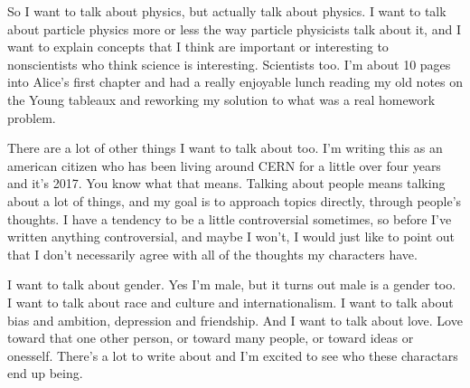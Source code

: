So I want to talk about physics, but actually talk about physics. I want to talk about particle physics more or less the way particle physicists talk about it, and I want to explain concepts that I think are important or interesting to nonscientists who think science is interesting. Scientists too. I'm about 10 pages into Alice's first chapter and had a really enjoyable lunch reading my old notes on the Young tableaux and reworking my solution to what was a real homework problem.

There are a lot of other things I want to talk about too. I'm writing this as an american citizen who has been living around CERN for a little over four years and it's 2017. You know what that means. Talking about people means talking about a lot of things, and my goal is to approach topics directly, through people's thoughts. I have a tendency to be a little controversial sometimes, so before I've written anything controversial, and maybe I won't, I would just like to point out that I don't necessarily agree with all of the thoughts my characters have. 

I want to talk about gender. Yes I'm male, but it turns out male is a gender too. I want to talk about race and culture and internationalism. I want to talk about bias and ambition, depression and friendship. And I want to talk about love. Love toward that one other person, or toward many people, or toward ideas or onesself. There's a lot to write about and I'm excited to see who these charactars end up being.
